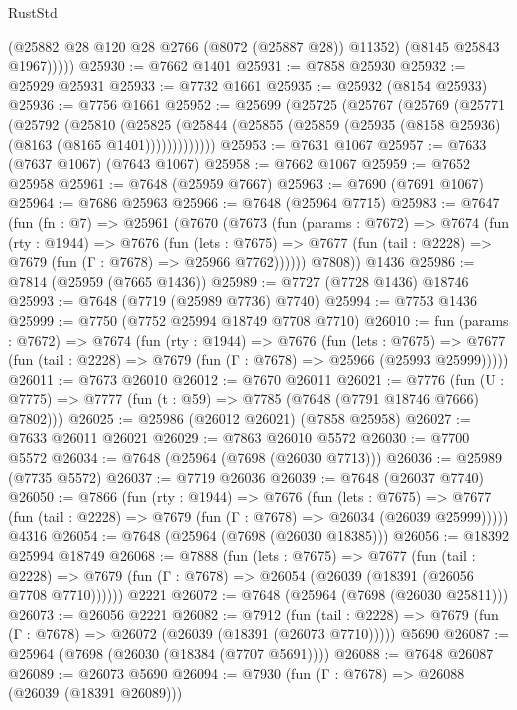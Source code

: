 \begin{lexlean}{RustStd}
\begin{coremodule}
{\begin{coremodule}
{{{{{{{{{{{{{{{{{{{{{{{{{{{{{{{{{{{{{{{{{{{{{{{{{{{{{            (@25882 @28 @120 @28 @2766 (@8072 (@25887 @28)) @11352)
            (@8145 @25843 @1967)))))
@25930 := @7662 @1401
@25931 := @7858 @25930
@25932 := @25929 @25931
@25933 := @7732 @1661
@25935 := @25932 (@8154 @25933)
@25936 := @7756 @1661
@25952 := @25699
    (@25725
      (@25767
        (@25769
          (@25771
            (@25792
              (@25810
                (@25825
                  (@25844 (@25855 (@25859 (@25935 (@8158 @25936) (@8163 (@8165 @1401)))))))))))))
@25953 := @7631 @1067
@25957 := @7633 (@7637 @1067) (@7643 @1067)
@25958 := @7662 @1067
@25959 := @7652 @25958
@25961 := @7648 (@25959 @7667)
@25963 := @7690 (@7691 @1067)
@25964 := @7686 @25963
@25966 := @7648 (@25964 @7715)
@25983 := @7647
    (fun (fn : @7) =>
    @25961
      (@7670
        (@7673
          (fun (params : @7672) =>
          @7674
            (fun (rty : @1944) =>
            @7676
              (fun (lets : @7675) =>
              @7677 (fun (tail : @2228) => @7679 (fun (Γ : @7678) => @25966 @7762))))))
        @7808))
    @1436
@25986 := @7814 (@25959 (@7665 @1436))
@25989 := @7727 (@7728 @1436) @18746
@25993 := @7648 (@7719 (@25989 @7736) @7740)
@25994 := @7753 @1436
@25999 := @7750 (@7752 @25994 @18749 @7708 @7710)
@26010 := fun (params : @7672) =>
  @7674
    (fun (rty : @1944) =>
    @7676
      (fun (lets : @7675) =>
      @7677 (fun (tail : @2228) => @7679 (fun (Γ : @7678) => @25966 (@25993 @25999)))))
@26011 := @7673 @26010
@26012 := @7670 @26011
@26021 := @7776
    (fun (U : @7775) => @7777 (fun (t : @59) => @7785 (@7648 (@7791 @18746 @7666) @7802)))
@26025 := @25986 (@26012 @26021) (@7858 @25958)
@26027 := @7633 @26011 @26021
@26029 := @7863 @26010 @5572
@26030 := @7700 @5572
@26034 := @7648 (@25964 (@7698 (@26030 @7713)))
@26036 := @25989 (@7735 @5572)
@26037 := @7719 @26036
@26039 := @7648 (@26037 @7740)
@26050 := @7866
    (fun (rty : @1944) =>
    @7676
      (fun (lets : @7675) =>
      @7677 (fun (tail : @2228) => @7679 (fun (Γ : @7678) => @26034 (@26039 @25999)))))
    @4316
@26054 := @7648 (@25964 (@7698 (@26030 @18385)))
@26056 := @18392 @25994 @18749
@26068 := @7888
    (fun (lets : @7675) =>
    @7677
      (fun (tail : @2228) =>
      @7679 (fun (Γ : @7678) => @26054 (@26039 (@18391 (@26056 @7708 @7710))))))
    @2221
@26072 := @7648 (@25964 (@7698 (@26030 @25811)))
@26073 := @26056 @2221
@26082 := @7912
    (fun (tail : @2228) => @7679 (fun (Γ : @7678) => @26072 (@26039 (@18391 (@26073 @7710)))))
    @5690
@26087 := @25964 (@7698 (@26030 (@18384 (@7707 @5691))))
@26088 := @7648 @26087
@26089 := @26073 @5690
@26094 := @7930 (fun (Γ : @7678) => @26088 (@26039 (@18391 @26089)))
}}}}}}}}}}}}}}}}}}}}}}}}}}}}}}}}}}}}}}}}}}}}}}}}}}}}}
\end{coremodule}}
\end{coremodule}
\end{lexlean}
